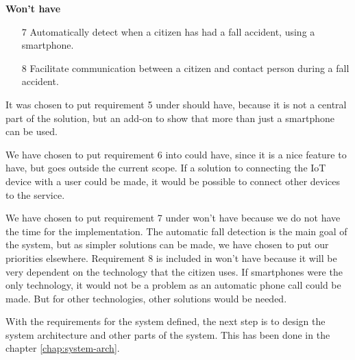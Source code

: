 \textbf{Won't have}
\begin{itemize}
    \item[7] Automatically detect when a citizen has had a fall accident, using a smartphone.
    \item[8] Facilitate communication between a citizen and contact person during a fall accident.
\end{itemize}


It was chosen to put requirement 5 under should have, because it is not a central part of the solution, but an add-on to show that more than just a smartphone can be used. 

We have chosen to put requirement 6 into could have, since it is a nice feature to have, but goes outside the current scope. If a solution to connecting the IoT device with a user could be made, it would be possible to connect other devices to the service.

We have chosen to put requirement 7 under won't have because we do not have the time for the implementation. The automatic fall detection is the main goal of the system, but as simpler solutions can be made, we have chosen to put our priorities elsewhere.
Requirement 8 is included in won't have because it will be very dependent on the technology that the citizen uses. If smartphones were the only technology, it would not be a problem as an automatic phone call could be made. But for other technologies, other solutions would be needed.



With the requirements for the system defined, the next step is to design the system architecture and other parts of the system. This has been done in the chapter \ref{chap:system-arch}.